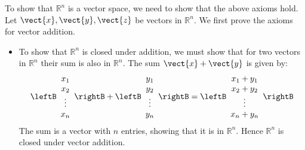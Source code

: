 \begin{solution}
To show that $\mathbb{R}^n$ is a vector space, we need to show that the above axioms hold. Let $\vect{x}, \vect{y}, \vect{z}$ be vectors in $\mathbb{R}^n$. We first prove the axioms for vector addition. 
\begin{itemize}
\item 
To show that $\mathbb{R}^n$ is closed under addition, we must show that for two vectors in $\mathbb{R}^n$ their sum is also in $\mathbb{R}^n$. The sum $\vect{x} + \vect{y}$ is given by:
\[
\leftB \begin{array}{c}
x_1 \\
x_2 \\
\vdots \\
x_n
\end{array}\rightB + 
\leftB \begin{array}{c}
y_1 \\
y_2 \\
\vdots \\
y_n
\end{array}\rightB = 
\leftB \begin{array}{c}
x_1 + y_1 \\
x_2 + y_2 \\
\vdots \\
x_n + y_n
\end{array}\rightB
\]
The sum is a vector with $n$ entries, showing that it is in $\mathbb{R}^n$. Hence $\mathbb{R}^n$ is closed under vector addition.


\end{itemize}
\end{solution}
